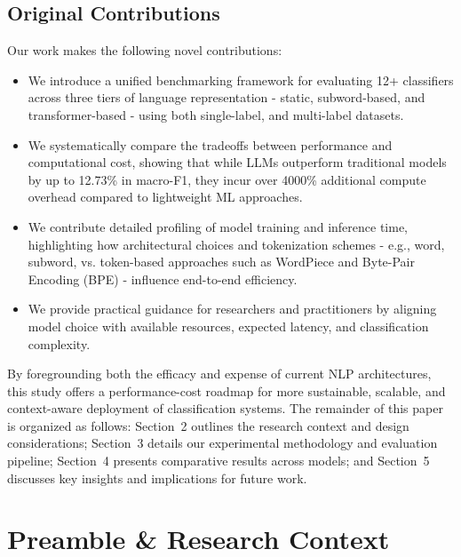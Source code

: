 \documentclass[final]{clv2025}
\begin{document}
\subsection*{Original Contributions}

Our work makes the following novel contributions:

\begin{itemize}
    \item We introduce a unified benchmarking framework for evaluating 12+ classifiers across three tiers of language representation - static, subword-based, and transformer-based - using both single-label, and multi-label datasets.
    \item We systematically compare the tradeoffs between performance and computational cost, showing that while LLMs outperform traditional models by up to 12.73\% in macro-F1, they incur over 4000\% additional compute overhead compared to lightweight ML approaches.
    \item We contribute detailed profiling of model training and inference time, highlighting how architectural choices and tokenization schemes - e.g., word, subword, vs. token-based approaches such as WordPiece and Byte-Pair Encoding (BPE) - influence end-to-end efficiency.
    \item We provide practical guidance for researchers and practitioners by aligning model choice with available resources, expected latency, and classification complexity.
\end{itemize}

By foregrounding both the efficacy and expense of current NLP architectures, this study offers a performance-cost roadmap for more sustainable, scalable, and context-aware deployment of classification systems. The remainder of this paper is organized as follows: Section~2 outlines the research context and design considerations; Section~3 details our experimental methodology and evaluation pipeline; Section~4 presents comparative results across models; and Section~5 discusses key insights and implications for future work.


\section{Preamble \& Research Context}
\end{document}
